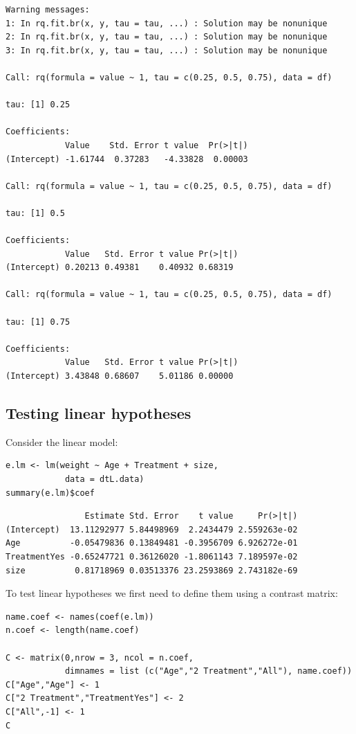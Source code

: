 \documentclass{article}
\begin{document}
\begin{verbatim}
Warning messages:
1: In rq.fit.br(x, y, tau = tau, ...) : Solution may be nonunique
2: In rq.fit.br(x, y, tau = tau, ...) : Solution may be nonunique
3: In rq.fit.br(x, y, tau = tau, ...) : Solution may be nonunique

Call: rq(formula = value ~ 1, tau = c(0.25, 0.5, 0.75), data = df)

tau: [1] 0.25

Coefficients:
            Value    Std. Error t value  Pr(>|t|)
(Intercept) -1.61744  0.37283   -4.33828  0.00003

Call: rq(formula = value ~ 1, tau = c(0.25, 0.5, 0.75), data = df)

tau: [1] 0.5

Coefficients:
            Value   Std. Error t value Pr(>|t|)
(Intercept) 0.20213 0.49381    0.40932 0.68319 

Call: rq(formula = value ~ 1, tau = c(0.25, 0.5, 0.75), data = df)

tau: [1] 0.75

Coefficients:
            Value   Std. Error t value Pr(>|t|)
(Intercept) 3.43848 0.68607    5.01186 0.00000
\end{verbatim}

\subsection{Testing linear hypotheses}
\label{sec:org1accc7f}

Consider the linear model:
\lstset{language=r,label= ,caption= ,captionpos=b,numbers=none}
\begin{lstlisting}
e.lm <- lm(weight ~ Age + Treatment + size,
			data = dtL.data)
summary(e.lm)$coef
\end{lstlisting}

\begin{verbatim}
                Estimate Std. Error    t value     Pr(>|t|)
(Intercept)  13.11292977 5.84498969  2.2434479 2.559263e-02
Age          -0.05479836 0.13849481 -0.3956709 6.926272e-01
TreatmentYes -0.65247721 0.36126020 -1.8061143 7.189597e-02
size          0.81718969 0.03513376 23.2593869 2.743182e-69
\end{verbatim}

To test linear hypotheses we first need to define them using a contrast matrix:
\lstset{language=r,label= ,caption= ,captionpos=b,numbers=none}
\begin{lstlisting}
name.coef <- names(coef(e.lm))
n.coef <- length(name.coef)

C <- matrix(0,nrow = 3, ncol = n.coef, 
			dimnames = list (c("Age","2 Treatment","All"), name.coef))
C["Age","Age"] <- 1
C["2 Treatment","TreatmentYes"] <- 2
C["All",-1] <- 1
C
\end{lstlisting}
\end{document}

